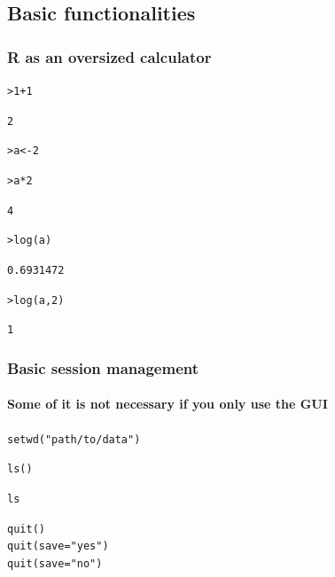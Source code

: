\documentclass[t]{beamer} %
\begin{document}
\subsection{Basic functionalities}

\begin{frame}[fragile]
  \frametitle{R as an oversized calculator}
  
\begin{alltt}
> 1+1  \begin{Rout}
[1] 2
\end{Rout}
> a <- 2     

> a * 2  \begin{Rout}
[1] 4
\end{Rout}
> log(a)     \begin{Rout}
[1] 0.6931472
\end{Rout}
> log(a,2)   \begin{Rout}
[1] 1
\end{Rout}
\end{alltt}

\end{frame}



\begin{frame}[fragile]
  \frametitle{Basic session management}
  \framesubtitle{Some of it is not necessary if you only use the GUI}

\ungap[1]
\begin{alltt}

setwd("path/to/data")  

ls()                   

ls                     

quit()                 
quit(save="yes")
quit(save="no")

\end{alltt}

\end{frame}
\end{document}
